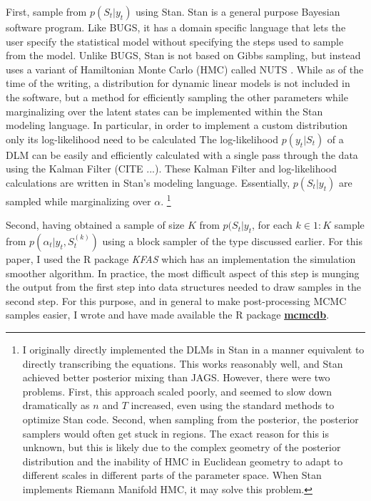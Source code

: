 \documentclass{article}
\newcommand{\RLang}{\textsf{R}}
\begin{document}
First, sample from $p(S_{t} | y_{t})$ using Stan.
Stan is a general purpose Bayesian software program.
Like BUGS, it has a domain specific language that lets the user specify the statistical model without specifying the steps used to sample from the model.
Unlike BUGS, Stan is not based on Gibbs sampling, but instead uses a variant of Hamiltonian Monte Carlo (HMC) called NUTS \parencite{HoffmanGelman2013}.
While as of the time of the writing, a distribution for dynamic linear models is not included in the software, but a method for efficiently sampling the other parameters while marginalizing over the latent states can be implemented within the Stan modeling language.
In particular, in order to implement a custom distribution only its log-likelihood need to be calculated \parencite[Chapter 17]{Stan2013}
The log-likelihood $p(y_{t} | S_{t})$ of a DLM can be easily and efficiently calculated with a single pass through the data using the Kalman Filter (CITE ...).
These Kalman Filter and log-likelihood calculations are written in Stan's modeling language.
Essentially, $p(S_{t} | y_{t})$ are sampled while marginalizing over $\alpha$.
\footnote{
  I originally directly implemented the DLMs in Stan in a manner equivalent to directly transcribing the equations.
  This works reasonably well, and Stan achieved better posterior mixing than JAGS.
  However, there were two problems. 
  First, this approach scaled poorly, and seemed to slow down dramatically as $n$ and $T$ increased, even using the standard methods to optimize Stan code.
  Second, when sampling from the posterior, the posterior samplers would often get stuck in regions.
  The exact reason for this is unknown, but this is likely due to the complex geometry of the posterior distribution and the inability of HMC in Euclidean geometry to adapt to different scales in different parts of the parameter space.
  When Stan implements Riemann Manifold HMC, it may solve this problem.
}

Second, having obtained a sample of size $K$ from $p(S_{t} | y_{t}$, for each $k \in 1:K$ sample from $p(\alpha_{t} | y_{t}, S_{t}^{(k)})$ using a block sampler of the type discussed earlier.
For this paper, I used the R package \textit{KFAS} \parencite{Helske2012} which has an implementation the \textcite{DurbinKoopman2002} simulation smoother algorithm.
In practice, the most difficult aspect of this step is munging the output from the first step into data structures needed to draw samples in the second step.
For this purpose, and in general to make post-processing MCMC samples easier, I wrote and have made available the \RLang{} package \href{https://github.com/jrnold/mcmcdb}{\textbf{mcmcdb}}.
\end{document}
